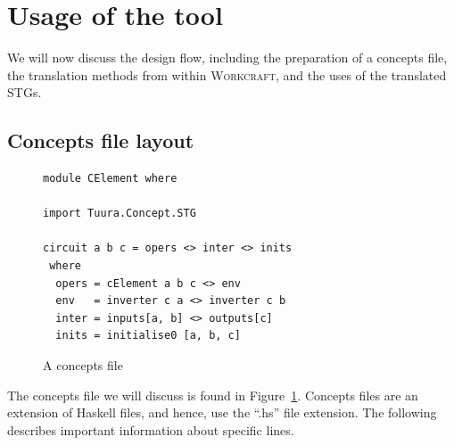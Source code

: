 \documentclass[british,conference,compsoc]{IEEEtran}
\newcommand{\noun}[1]{\textsc{#1}}
\begin{document}

\section{Usage of the tool\label{sec:tool-use}}

\vspace{-3mm}

We will now discuss the design flow, including the preparation of 
a concepts file, the translation methods from within \noun{Workcraft}, and 
the uses of the translated STGs.

\vspace{-3mm}

\subsection{Concepts file layout \label{sub:file_layout}}

\vspace{-4mm}

\begin{figure}[h]
\begin{centering}
\vspace{-3mm}
\begin{verbatim}
module CElement where

import Tuura.Concept.STG

circuit a b c = opers <> inter <> inits 
 where
  opers = cElement a b c <> env
  env   = inverter c a <> inverter c b
  inter = inputs[a, b] <> outputs[c] 
  inits = initialise0 [a, b, c]
\end{verbatim}

\par\end{centering}
\vspace{-1mm}
\begin{centering}
\protect\caption{\label{fig:concepts_file}A concepts file}
\vspace{-3mm}
\par\end{centering}

\end{figure}

The concepts file we will discuss is found in Figure~\ref{fig:concepts_file}.
Concepts files are an extension of Haskell files, and hence, use the ``.hs'' file extension.
The following describes important information about specific lines.
\end{document}

